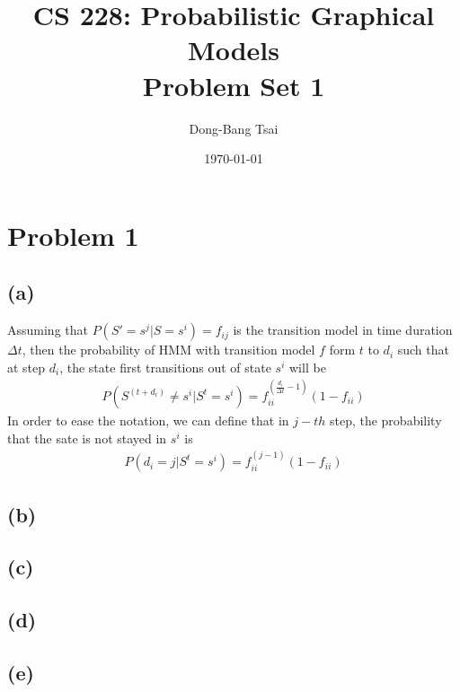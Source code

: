 \documentclass[pra,groupedaddress,amsmath,amssymb, column]{revtex4}
\begin{document}
\title{CS 228: Probabilistic Graphical Models \\ Problem Set 1}
\author{Dong-Bang Tsai}



\date{\today}
\maketitle


\section*{Problem 1}
\subsection*{(a)}

Assuming that $P(S'=s^j|S=s^i)=f_{ij}$ is the transition model in time duration $\Delta t$, then the  probability of HMM with transition model $f$ form $t$ to $d_i$ such that at step $d_i$, the state first transitions out of state $s^i$ will be
\begin{align}
P(S^{(t+d_i)} \neq s^i |  S^t=s^i) = f_{ii}^{(\frac{d_i}{\Delta t}-1)}(1-f_{ii})
\end{align}
In order to ease the notation, we can define that in $j-th$ step, the probability that the sate is not stayed in $s^i$ is 
\begin{align}
P(d_i=j|  S^t=s^i) = f_{ii}^{(j-1)}(1-f_{ii})
\end{align}

\subsection*{(b)}

\subsection*{(c)}

\subsection*{(d)}

\subsection*{(e)}
\end{document}
